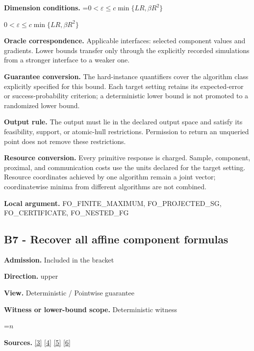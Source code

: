 \documentclass[10pt,a4paper]{article}
\newcommand{\AtlasMath}[1]{\par\begingroup\centering\setbox0=\hbox{$\displaystyle #1$}\ifdim\wd0>1.4\linewidth\typeout{ATLAS WIDE FORMULA: \the\wd0}\fi\ifdim\wd0>\linewidth\resizebox{\linewidth}{!}{\box0}\else\box0\fi\par\endgroup}
\newcommand{\AtlasInlineMath}[1]{\begingroup\setbox0=\hbox{$#1$}\ifdim\wd0>.4\linewidth\endgroup\AtlasMath{#1}\else\endgroup$#1$\fi}
\begin{document}
\textbf{Dimension conditions.} \AtlasInlineMath{0<\varepsilon\le c\min\{LR,\beta R^2\}}



\textbf{Oracle correspondence.} Applicable interfaces: selected component values and gradients. Lower bounds transfer only through the explicitly recorded simulations from a stronger interface to a weaker one.



\textbf{Guarantee conversion.} The hard-instance quantifiers cover the algorithm class explicitly specified for this bound. Each target setting retains its expected-error or success-probability criterion; a deterministic lower bound is not promoted to a randomized lower bound.



\textbf{Output rule.} The output must lie in the declared output space and satisfy its feasibility, support, or atomic-hull restrictions. Permission to return an unqueried point does not remove these restrictions.



\textbf{Resource conversion.} Every primitive response is charged. Sample, component, proximal, and communication costs use the units declared for the target setting. Resource coordinates achieved by one algorithm remain a joint vector; coordinatewise minima from different algorithms are not combined.



\textbf{Local argument.} FO\_FINITE\_MAXIMUM, FO\_PROJECTED\_SG, FO\_CERTIFICATE, FO\_NESTED\_FG



\subsection{B7 - Recover all affine component formulas}


\textbf{Admission.} Included in the bracket



\textbf{Direction.} upper



\textbf{View.} Deterministic / Pointwise guarantee



\textbf{Witness or lower-bound scope.} Deterministic witness



\AtlasMath{n}


\textbf{Sources.} \href{https://arxiv.org/pdf/2311.10886}{[3]} \href{https://arxiv.org/pdf/1405.4980}{[4]} \href{https://www2.isye.gatech.edu/~nemirovs/MOR_AccuracyCertificates.pdf}{[5]} \href{https://arxiv.org/pdf/2609.20701}{[6]}
\end{document}
